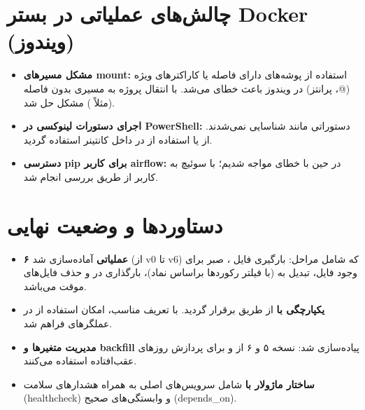 \documentclass[12pt,a4paper]{article}
\begin{document}
\section{چالش‌های عملیاتی در بستر Docker (ویندوز)}
\begin{itemize}
\item \textbf{مشکل مسیرهای mount:} استفاده از پوشه‌های دارای فاصله یا کاراکترهای ویژه (@، پرانتز) در ویندوز باعث خطای  می‌شد. با انتقال پروژه به مسیری بدون فاصله (مثلاً ) مشکل حل شد.
\item \textbf{اجرای دستورات لینوکسی در PowerShell:} دستوراتی مانند  شناسایی نمی‌شدند. از  یا استفاده از  در داخل کانتینر استفاده گردید.
\item \textbf{دسترسی pip برای کاربر airflow:} در حین  با خطای  مواجه شدیم؛ با سوئیچ به کاربر  از طریق  بررسی انجام شد.
\end{itemize}

\section{دستاوردها و وضعیت نهایی}
\begin{itemize}
\item \textbf{۶  عملیاتی} آماده‌سازی شد (از v0 تا v6) که شامل مراحل: بارگیری فایل ، صبر برای وجود فایل، تبدیل به  (با فیلتر رکوردها براساس نماد)، بارگذاری در  و حذف فایل‌های موقت می‌باشد.
\item \textbf{یکپارچگی  با } از طریق  برقرار گردید. با تعریف  مناسب، امکان استفاده از  در عملگرهای  فراهم شد.
\item \textbf{مدیریت متغیرها و backfill} پیاده‌سازی شد:  نسخه ۵ و ۶ از  و  برای پردازش روزهای عقب‌افتاده استفاده می‌کنند.
\item \textbf{ساختار ماژولار با } شامل سرویس‌های اصلی به همراه هشدارهای سلامت (healthcheck) و وابستگی‌های صحیح (depends\_on).
\end{itemize}
\end{document}
